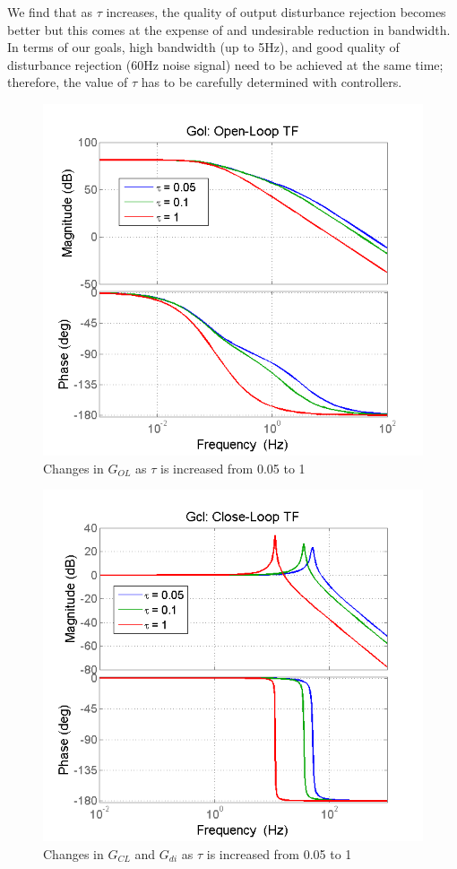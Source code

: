 \documentclass{article}
\theoremstyle{plain}
\theoremstyle{definition}
\theoremstyle{remark}
\begin{document}
We find that as $\tau$ increases, the quality of output disturbance rejection becomes better but this comes at the expense of and undesirable reduction in bandwidth.  In terms of our goals, high bandwidth (up to 5Hz), and good quality of disturbance rejection (60Hz noise signal) need to be achieved at the same time; therefore, the value of $\tau$ has to be carefully determined with controllers.

\begin{figure}[htb]
\begin{center}
\includegraphics[width = 10 cm]{q3_8}
\caption{Changes in $G_{OL}$ as $\tau$ is increased from 0.05 to 1}
\label{q3_8}
\end{center}
\end{figure}

\begin{figure}[htb]
\begin{center}
\includegraphics[width = 10 cm]{q3_9}
\caption{Changes in $G_{CL}$  and $G_{di}$ as $\tau$ is increased from 0.05 to 1}
\label{q3_9}
\end{center}
\end{figure}
\end{document}
